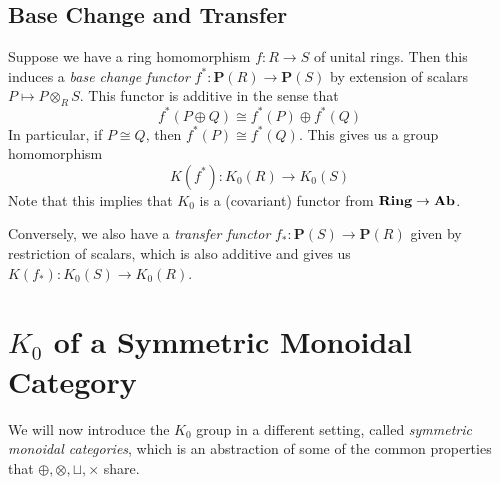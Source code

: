 \subsection{Base Change and Transfer}

Suppose we have a ring homomorphism $f : R \to S$ of unital rings.
Then this induces a \emph{base change functor} $f^* : \mathbf P(R) \to \mathbf P(S)$
by extension of scalars $P \mapsto P \otimes_R S$. 
This functor is additive in the sense that
\[
f^*(P \oplus Q) \cong f^*(P) \oplus f^*(Q)
\]
In particular, if $P \cong Q$, then $f^*(P) \cong f^*(Q)$.
This gives us a group homomorphism 
\[
K(f^*) : K_0(R) \to K_0(S)
\]
Note that this implies that $K_0$ is a (covariant) functor from $\mathbf{Ring} \to \mathbf{Ab}$.

Conversely, we also have a \emph{transfer functor} $f_* : \mathbf P(S) \to \mathbf P(R)$ given 
by restriction of scalars, which is also additive and gives us
$K(f_*) : K_0(S) \to K_0(R)$.

\section{$K_0$ of a Symmetric Monoidal Category}

We will now introduce the $K_0$ group in a different setting, called
\emph{symmetric monoidal categories}, which is an abstraction of some of the common
properties that $\oplus, \otimes, \sqcup, \times$ share.

